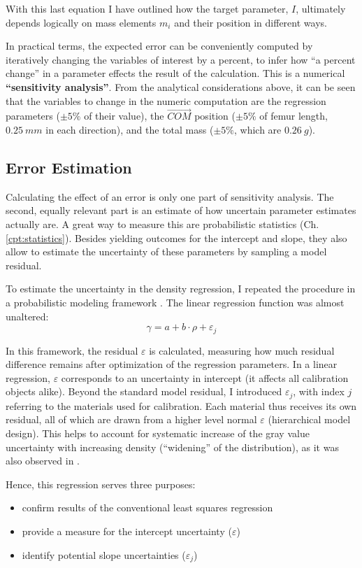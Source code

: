 With this last equation I have outlined how the target parameter, \(I\), ultimately depends logically on mass elements \(m_{i}\) and their position in different ways.


In practical terms, the expected error can be conveniently computed by iteratively changing the variables of interest by a percent, to infer how ``a percent change'' in a parameter effects the result of the calculation.
This is a numerical \textbf{``sensitivity analysis''}.
From the analytical considerations above, it can be seen that the variables to change in the numeric computation are the regression parameters (\(\pm 5 \%\) of their value), the \(\vec{COM}\) position (\(\pm 5 \%\) of femur length, \(0.25\ mm\) in each direction), and the total mass (\(\pm 5 \%\), which are \(0.26\ g\)).
\subsection{Error Estimation}
\label{sec:org79b4ad7}
Calculating the effect of an error is only one part of sensitivity analysis.
The second, equally relevant part is an estimate of how uncertain parameter estimates actually are.
A great way to measure this are probabilistic statistics (Ch. \ref{cpt:statistics}).
Besides yielding outcomes for the intercept and slope, they also allow to estimate the uncertainty of these parameters by sampling a model residual.


To estimate the uncertainty in the density regression, I repeated the procedure in a probabilistic modeling framework \citep[PyMC, Version 5.6,][]{Salvatier2016}.
The linear regression function was almost unaltered:
\[\gamma = a+b\cdot\rho + \varepsilon_{j}\]


In this framework, the residual \(\varepsilon\) is calculated, measuring how much residual difference remains after optimization of the regression parameters.
In a linear regression, \(\varepsilon\) corresponds to an uncertainty in intercept (it affects all calibration objects alike).
Beyond the standard model residual, I introduced \(\varepsilon_{j}\), with index \(j\) referring to the materials used for calibration.
Each material thus receives its own residual, all of which are drawn from a higher level normal \(\varepsilon\) (hierarchical model design).
This helps to account for systematic increase of the gray value uncertainty with increasing density (``widening'' of the distribution), as it was also observed in \citet{DuPlessis2013}.

Hence, this regression serves three purposes:
\begin{itemize}
\item confirm results of the conventional least squares regression
\item provide a measure for the intercept uncertainty (\(\varepsilon\))
\item identify potential slope uncertainties (\(\varepsilon_{j}\))
\end{itemize}


